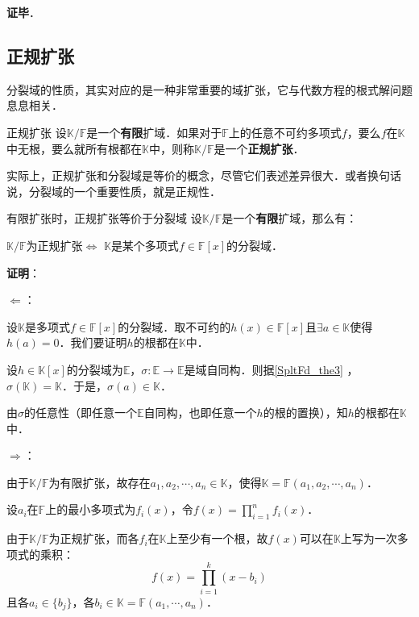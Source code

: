 \textbf{证毕}．




\subsection{正规扩张}

分裂域的性质，其实对应的是一种非常重要的域扩张，它与代数方程的根式解问题息息相关．

\begin{definition}{正规扩张}
设$\mathbb{K}/\mathbb{F}$是一个\textbf{有限}扩域．如果对于$\mathbb{F}$上的任意不可约多项式$f$，要么$f$在$\mathbb{K}$中无根，要么就所有根都在$\mathbb{K}$中，则称$\mathbb{K}/\mathbb{F}$是一个\textbf{正规扩张}．
\end{definition}

实际上，正规扩张和分裂域是等价的概念，尽管它们表述差异很大．或者换句话说，分裂域的一个重要性质，就是正规性．


\begin{theorem}{有限扩张时，正规扩张等价于分裂域}\label{SpltFd_the2}
设$\mathbb{K}/\mathbb{F}$是一个\textbf{有限}扩域，那么有：

$\mathbb{K}/\mathbb{F}$为正规扩张$\iff$ $\mathbb{K}$是某个多项式$f\in\mathbb{F}[x]$的分裂域．
\end{theorem}

\textbf{证明}：

$\Leftarrow$：

设$\mathbb{K}$是多项式$f\in\mathbb{F}[x]$的分裂域．取不可约的$h(x)\in\mathbb{F}[x]$且$\exists a\in\mathbb{K}$使得$h(a)=0$．我们要证明$h$的根都在$\mathbb{K}$中．


设$h\in\mathbb{K}[x]$的分裂域为$\mathbb{E}$，$\sigma:\mathbb{E}\to\mathbb{E}$是域自同构．则据\autoref{SpltFd_the3} ，$\sigma(\mathbb{K})=\mathbb{K}$．于是，$\sigma(a)\in\mathbb{K}$．

由$\sigma$的任意性（即任意一个$\mathbb{E}$自同构，也即任意一个$h$的根的置换），知$h$的根都在$\mathbb{K}$中．



$\Rightarrow$：

由于$\mathbb{K}/\mathbb{F}$为有限扩张，故存在$a_1, a_2, \cdots, a_n\in \mathbb{K}$，使得$\mathbb{K}=\mathbb{F}(a_1, a_2, \cdots, a_n)$．

设$a_i$在$\mathbb{F}$上的最小多项式为$f_i(x)$，令$f(x)=\prod_{i=1}^n f_i(x)$．

由于$\mathbb{K}/\mathbb{F}$为正规扩张，而各$f_i$在$\mathbb{K}$上至少有一个根，故$f(x)$可以在$\mathbb{K}$上写为一次多项式的乘积：
\begin{equation}
f(x) = \prod_{i=1}^k (x-b_i)
\end{equation}
且各$a_i\in\{b_j\}$，各$b_i\in\mathbb{K}=\mathbb{F}(a_1, \cdots, a_n)$．

